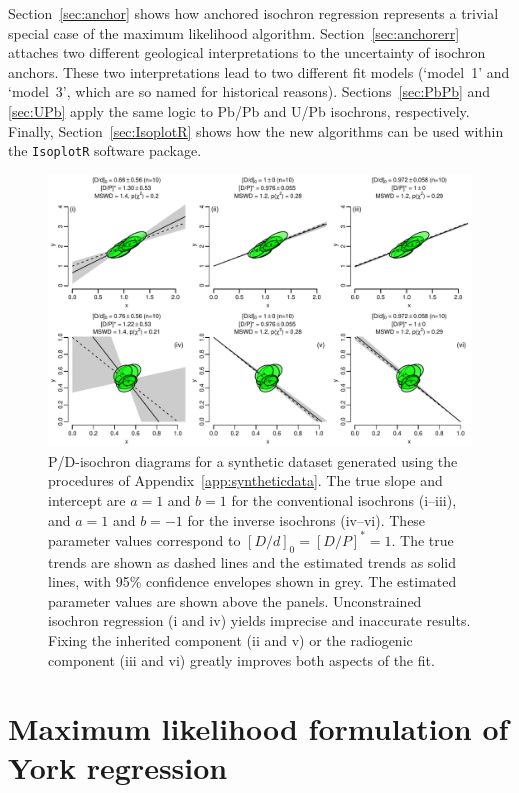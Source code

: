\documentclass{article}
\begin{document}
  Section~\ref{sec:anchor} shows how anchored isochron regression
  represents a trivial special case of the maximum likelihood
  algorithm. Section~\ref{sec:anchorerr} attaches two different
  geological interpretations to the uncertainty of isochron
  anchors. These two interpretations lead to two different fit models
  (`model~1' and `model~3', which are so named for historical
  reasons). Sections~\ref{sec:PbPb} and \ref{sec:UPb} apply the same
  logic to Pb/Pb and U/Pb isochrons, respectively.  Finally,
  Section~\ref{sec:IsoplotR} shows how the new algorithms can be used
  within the \texttt{IsoplotR} software package.
  
  \begin{figure}[!ht]
    \includegraphics[width=15cm]{fig1.pdf}
    \caption{P/D-isochron diagrams for a synthetic dataset generated
      using the procedures of Appendix~\ref{app:syntheticdata}. The
      true slope and intercept are $a=1$ and $b=1$ for the
      conventional isochrons (i--iii), and $a=1$ and $b=-1$ for the
      inverse isochrons (iv--vi). These parameter values correspond to
      $[D/d]_0=[D/P]^{\ast}=1$. The true trends are shown as dashed
      lines and the estimated trends as solid lines, with 95\%
      confidence envelopes shown in grey. The estimated parameter
      values are shown above the panels. Unconstrained isochron
      regression (i and iv) yields imprecise and inaccurate
      results. Fixing the inherited component (ii and v) or the
      radiogenic component (iii and vi) greatly improves both aspects
      of the fit.}
    \label{fig:cluster}
  \end{figure}
  
\section{Maximum likelihood formulation of York regression}\label{sec:MLyork}
\end{document}
